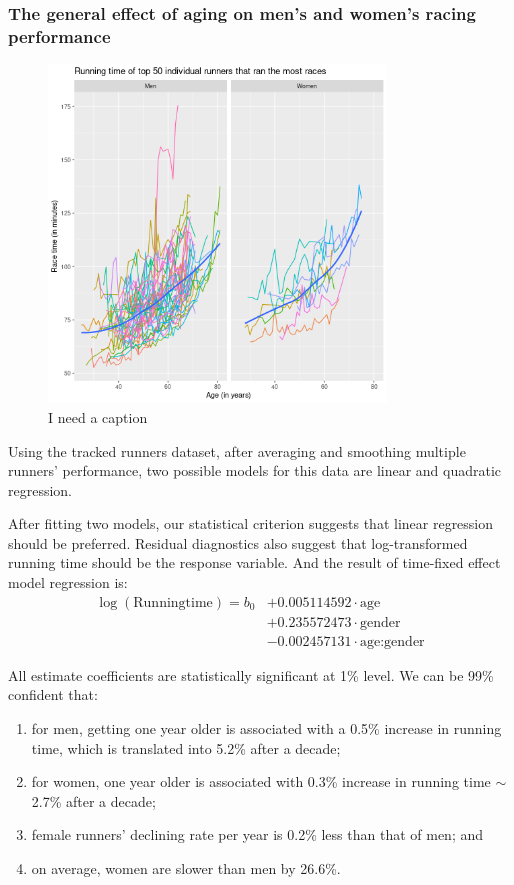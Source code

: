 \documentclass[12pt]{article}
\begin{document}
\subsubsection*{The general effect of aging on
	men's and women's racing performance}

\begin{figure}[ht]
	\centering
	\includegraphics[width = 0.8\textwidth]
	{../figure/overview_tracked_runners-4.png}
	\caption{I need a caption}
	\label{tracked-runners-smooth}
\end{figure}

Using the tracked runners dataset, after averaging and smoothing multiple
runners' performance, two possible models for this data are linear and
quadratic regression.

After fitting two models, our statistical criterion suggests that linear
regression should be preferred.
Residual diagnostics also suggest that log-transformed running time should
be the response variable.
And the result of time-fixed effect model regression is:
\begin{align*}
	\log(\text{Runningtime})
	= b_0 &+ 0.005114592 \cdot \text{age}
	\\&
	+ 0.235572473 \cdot \text{gender}
	\\&
	- 0.002457131 \cdot \text{age:gender}
\end{align*}


All estimate coefficients are statistically significant at 1\% level.
We can be 99\% confident that:
\begin{enumerate}[label=(\roman*)]
	\item for men, getting one year older is associated with a 0.5\%
		increase in running time, which is translated into 5.2\% after a decade;
	\item for women, one year older is associated with 0.3\% increase in
		running time $\sim$ 2.7\% after a decade;
	\item female runners' declining rate per year is 0.2\% less than that of
		men; and
	\item on average, women are slower than men by 26.6\%.
\end{enumerate}
\end{document}
